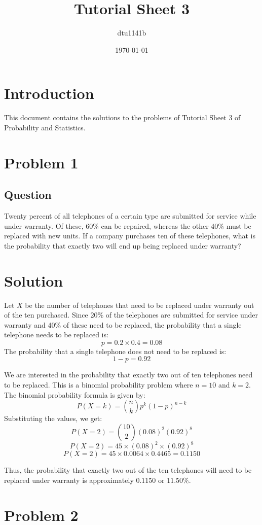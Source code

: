 \documentclass{article}
\title{Tutorial Sheet 3}
\author{dtu1141b}
\date{\today}
\begin{document}
\maketitle

\section*{Introduction}
This document contains the solutions to the problems of Tutorial Sheet 3 of Probability and Statistics.

\section*{Problem 1}
\subsection*{Question}
Twenty percent of all telephones of a certain type are submitted for service while under warranty. Of these, 60\% can be repaired, whereas the other 40\% must be replaced with new units. If a company purchases ten of these telephones, what is the probability that exactly two will end up being replaced under warranty?
\section*{Solution}

Let \(X\) be the number of telephones that need to be replaced under warranty out of the ten purchased. Since 20\% of the telephones are submitted for service under warranty and 40\% of these need to be replaced, the probability that a single telephone needs to be replaced is:
\[
p = 0.2 \times 0.4 = 0.08
\]
The probability that a single telephone does not need to be replaced is:
\[
1 - p = 0.92
\]

We are interested in the probability that exactly two out of ten telephones need to be replaced. This is a binomial probability problem where \(n = 10\) and \(k = 2\). The binomial probability formula is given by:
\[
P(X = k) = \binom{n}{k} p^k (1-p)^{n-k}
\]
Substituting the values, we get:
\[
P(X = 2) = \binom{10}{2} (0.08)^2 (0.92)^8
\]
\[
P(X = 2) = 45 \times (0.08)^2 \times (0.92)^8
\]
\[
P(X = 2) = 45 \times 0.0064 \times 0.4465 = 0.1150
\]

Thus, the probability that exactly two out of the ten telephones will need to be replaced under warranty is approximately \(0.1150\) or \(11.50\%\).
\section*{Problem 2}
\end{document}
